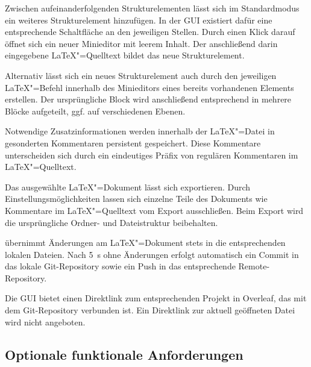 Zwischen aufeinanderfolgenden Strukturelementen lässt sich im Standardmodus ein weiteres Strukturelement hinzufügen.
In der GUI existiert dafür eine entsprechende Schaltfläche an den jeweiligen Stellen.
Durch einen Klick darauf öffnet sich ein neuer Minieditor mit leerem Inhalt.
Der anschließend darin eingegebene \LaTeX"=Quelltext bildet das neue Strukturelement.

Alternativ lässt sich ein neues Strukturelement auch durch den jeweiligen \LaTeX"=Befehl innerhalb des Minieditors
eines bereits vorhandenen Elements erstellen.
Der ursprüngliche Block wird anschließend entsprechend in mehrere Blöcke aufgeteilt, ggf. auf verschiedenen Ebenen.


Notwendige Zusatzinformationen werden innerhalb der \LaTeX"=Datei in gesonderten Kommentaren persistent gespeichert.
Diese Kommentare unterscheiden sich durch ein eindeutiges Präfix von regulären Kommentaren im \LaTeX"=Quelltext.


Das ausgewählte \LaTeX"=Dokument lässt sich exportieren.
Durch Einstellungsmöglichkeiten lassen sich einzelne Teile des Dokuments wie Kommentare im \LaTeX"=Quelltext vom Export
ausschließen.
Beim Export wird die ursprüngliche Ordner- und Dateistruktur beibehalten.


\texla{} übernimmt Änderungen am \LaTeX"=Dokument stets in die entsprechenden lokalen Dateien.
Nach 5~\si{\second} ohne Änderungen erfolgt automatisch ein Commit in das lokale Git-Repository sowie ein Push in das
entsprechende Remote-Repository.


Die GUI bietet einen Direktlink zum entsprechenden Projekt in Overleaf, das mit dem Git-Repository verbunden ist.
Ein Direktlink zur aktuell geöffneten Datei wird nicht angeboten.

\clearpage

\subsection{Optionale funktionale Anforderungen}
\label{subsec:optionale-funktionale-anforderungen}

